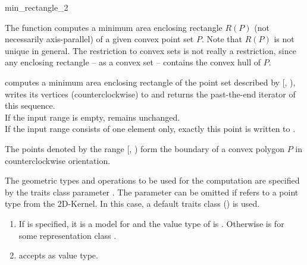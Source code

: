 
\cgalColumnLayout

\begin{ccRefFunction}{min_rectangle_2}
  
  \ccDefinition The function computes a minimum area enclosing
  rectangle $R(P)$ (not necessarily axis-parallel) of a given convex
  point set $P$.  Note that $R(P)$ is not unique in general. The
  restriction to convex sets is not really a restriction, since any
  enclosing rectangle -- as a convex set -- contains the convex hull
  of $P$.


  \def\ccLongParamLayout{\ccTrue} 
  
  
  computes a minimum area enclosing rectangle of the point set
  described by [, ), writes its
  vertices (counterclockwise) to  and returns the past-the-end
  iterator
  of this sequence.\\
  If the input range is empty,  remains unchanged.\\
  If the input range consists of one element only,
  exactly this point is written to .
  
  \ccPrecond The points denoted by the range [,
  ) form the boundary of a convex polygon $P$ in
  counterclockwise orientation.
  
  The geometric types and operations to be used for the computation
  are specified by the traits class parameter . The parameter
  can be omitted if  refers to a point type from
  the 2D-Kernel. In this case, a default traits class
  () is used.
  
  \ccRequire
  \begin{enumerate}
  \item If  is specified, it is a model for
     and the value type  of
     is .  Otherwise
     is  for some representation class
    .
  \item {} accepts  as value type.
  \end{enumerate}
  

\end{ccRefFunction}
